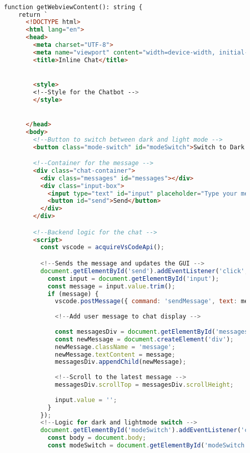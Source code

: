 \begin{lstlisting}[language=HTML, caption={IDE Chat GUI}]

    function getWebviewContent(): string {
        return `
          <!DOCTYPE html>
          <html lang="en">
          <head>
            <meta charset="UTF-8">
            <meta name="viewport" content="width=device-width, initial-scale=1.0">
            <title>Inline Chat</title>


            <style>
            <!--Style for the Chatbot -->
            </style>


          </head>
          <body>
            <!--Button to switch between dark and light mode -->
            <button class="mode-switch" id="modeSwitch">Switch to Dark Mode</button>

            <!--Container for the message -->
            <div class="chat-container">
              <div class="messages" id="messages"></div>
              <div class="input-box">
                <input type="text" id="input" placeholder="Type your message..." />
                <button id="send">Send</button>
              </div>
            </div>

            <!--Backend logic for the chat -->
            <script>
              const vscode = acquireVsCodeApi();

              <!--Sends the message and updates the GUI -->
              document.getElementById('send').addEventListener('click', () => {
                const input = document.getElementById('input');
                const message = input.value.trim();
                if (message) {
                  vscode.postMessage({ command: 'sendMessage', text: message });
      
                  <!--Add user message to chat display -->
                  
                  const messagesDiv = document.getElementById('messages');
                  const newMessage = document.createElement('div');
                  newMessage.className = 'message';
                  newMessage.textContent = message;
                  messagesDiv.appendChild(newMessage);
      
                  <!--Scroll to the latest message -->
                  messagesDiv.scrollTop = messagesDiv.scrollHeight;
      
                  input.value = '';
                }
              });
              <!--Logic for dark and lightmode switch -->
              document.getElementById('modeSwitch').addEventListener('click', () => {
                const body = document.body;
                const modeSwitch = document.getElementById('modeSwitch');
      

\end{lstlisting}
